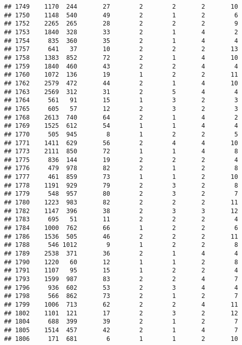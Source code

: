 \documentclass[]{article}
\begin{document}
\begin{verbatim}
## 1749    1170  244       27        2        2       2       10
## 1750    1148  540       49        2        1       2        6
## 1752    2265  265       28        2        2       2        9
## 1753    1840  328       33        2        1       4        2
## 1754     835  360       35        2        1       4        4
## 1757     641   37       10        2        2       2       13
## 1758    1383  852       72        2        1       4       10
## 1759    1840  460       43        2        2       4        4
## 1760    1072  136       19        1        2       2       11
## 1762    2579  472       44        2        1       4       10
## 1763    2569  312       31        2        5       4        4
## 1764     561   91       15        1        3       2        3
## 1765     605   57       12        2        3       2        3
## 1768    2613  740       64        2        1       4        2
## 1769    1525  612       54        1        1       4        4
## 1770     505  945        8        1        2       2        5
## 1771    1411  629       56        2        4       4       10
## 1773    2111  850       72        1        1       4        8
## 1775     836  144       19        2        2       2        4
## 1776     479  978       82        2        1       2        8
## 1777     461  859       73        1        1       2       10
## 1778    1191  929       79        2        3       2        8
## 1779     548  957       80        2        3       2        7
## 1780    1223  983       82        2        2       2       11
## 1782    1147  396       38        2        3       3       12
## 1783     695   51       11        2        2       2        4
## 1784    1000  762       66        1        2       2        6
## 1786    1536  505       46        2        2       2       11
## 1788     546 1012        9        1        2       2        8
## 1789    2538  371       36        2        1       4        4
## 1790    1220   60       12        1        1       2        8
## 1791    1107   95       15        1        2       2        4
## 1793    1599  987       83        2        2       4        7
## 1796     936  602       53        2        3       4        4
## 1798     566  862       73        2        1       2        7
## 1799    1006  713       62        2        2       4       11
## 1802    1101  121       17        2        3       2       12
## 1804     688  399       39        2        1       2        7
## 1805    1514  457       42        2        1       4        7
## 1806     171  681        6        1        1       2       10

\end{verbatim}
\end{document}
